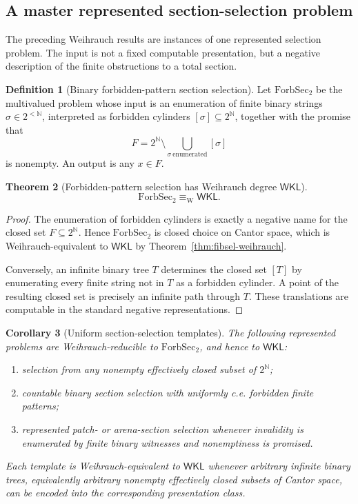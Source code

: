 \documentclass[11pt]{article}
\theoremstyle{plain}
\newtheorem{theorem}{Theorem}[section]
\newtheorem{corollary}[theorem]{Corollary}
\theoremstyle{definition}
\newtheorem{definition}[theorem]{Definition}
\theoremstyle{remark}
\newcommand{\N}{\mathbb{N}}
\begin{document}
\subsection{A master represented section-selection problem}
\label{subsec:master-weihrauch-section}

The preceding Weihrauch results are instances of one represented selection
problem. The input is not a fixed computable presentation, but a negative
description of the finite obstructions to a total section.

\begin{definition}[Binary forbidden-pattern section selection]
\label{def:forbidden-section-selection}
Let $\mathrm{ForbSec}_2$ be the multivalued problem whose input is an enumeration
of finite binary strings $\sigma\in2^{<\N}$, interpreted as forbidden cylinders
$[\sigma]\subseteq2^\N$, together with the promise that
\[
F=2^\N\setminus\bigcup_{\sigma\ \mathrm{enumerated}}[\sigma]
\]
is nonempty. An output is any $x\in F$.
\end{definition}

\begin{theorem}[Forbidden-pattern selection has Weihrauch degree $\mathsf{WKL}$]
\label{thm:forbidden-section-WKL}
\[
\mathrm{ForbSec}_2\equiv_{\mathrm W}\mathsf{WKL}.
\]
\end{theorem}

\begin{proof}
The enumeration of forbidden cylinders is exactly a negative name for the closed
set $F\subseteq2^\N$. Hence $\mathrm{ForbSec}_2$ is closed choice on Cantor space,
which is Weihrauch-equivalent to $\mathsf{WKL}$ by
Theorem~\ref{thm:fibsel-weihrauch}.

Conversely, an infinite binary tree $T$ determines the closed set $[T]$ by
enumerating every finite string not in $T$ as a forbidden cylinder. A point of the
resulting closed set is precisely an infinite path through $T$. These
translations are computable in the standard negative representations.
\end{proof}

\begin{corollary}[Uniform section-selection templates]
\label{cor:section-selection-templates}
The following represented problems are Weihrauch-reducible to
$\mathrm{ForbSec}_2$, and hence to $\mathsf{WKL}$:
\begin{enumerate}[label=(\roman*)]
\item selection from any nonempty effectively closed subset of $2^\N$;
\item countable binary section selection with uniformly c.e. forbidden finite
patterns;
\item represented patch- or arena-section selection whenever invalidity is
enumerated by finite binary witnesses and nonemptiness is promised.
\end{enumerate}
Each template is Weihrauch-equivalent to $\mathsf{WKL}$ whenever arbitrary
infinite binary trees, equivalently arbitrary nonempty effectively closed subsets
of Cantor space, can be encoded into the corresponding presentation class.
\end{corollary}
\end{document}
